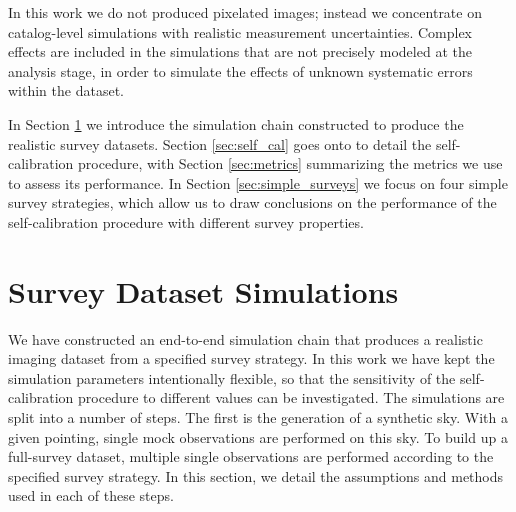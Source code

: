 \documentclass[manuscript]{aastex}
\begin{document}
In this work we do not produced pixelated images; instead we concentrate on catalog-level simulations with realistic measurement uncertainties. Complex effects are included in the simulations that are not  precisely modeled at the analysis stage, in order to simulate the effects of unknown systematic errors within the dataset.

In Section \ref{sec:survey_simulations} we introduce the simulation chain constructed to produce the realistic survey datasets. Section \ref{sec:self_cal} goes onto to detail the self-calibration procedure, with Section \ref{sec:metrics} summarizing the metrics we use to assess its performance. In Section \ref{sec:simple_surveys} we focus on four simple survey strategies, which allow us to draw conclusions on the performance of the self-calibration procedure with different survey properties. 

\section{Survey Dataset Simulations}
\label{sec:survey_simulations}
We have constructed an end-to-end simulation chain that produces a realistic imaging dataset from a specified survey strategy. In this work we have kept the simulation parameters intentionally flexible, so that the sensitivity of the self-calibration procedure to different values can be investigated. The simulations are split into a number of steps. The first is the generation of a synthetic sky. With a given pointing, single mock observations are performed on this sky. To build up a full-survey dataset, multiple single observations are performed according to the specified survey strategy. In this section, we detail the assumptions and methods used in each of these steps. 
\end{document}
